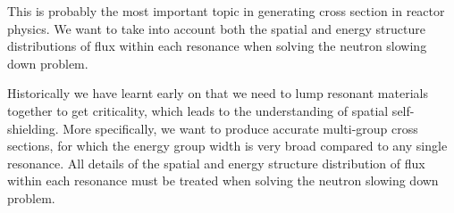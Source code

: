 \documentclass{school-22.211-notes}
\date{March  5, 2012}
\begin{document}
\maketitle


 \label{heterogeneous-geo}
This is probably the most important topic in generating cross section in reactor physics. We want to take into account both the spatial and energy structure distributions of flux within each resonance when solving the neutron slowing down problem. 

Historically we have learnt early on that we need to lump resonant materials together to get criticality, which leads to the understanding of spatial self-shielding. More specifically, we want to produce accurate multi-group cross sections, for which the energy group width is very broad compared to any single resonance. All details of the spatial and energy structure distribution of flux within each resonance must be treated when solving the neutron slowing down problem. 
\end{document}
